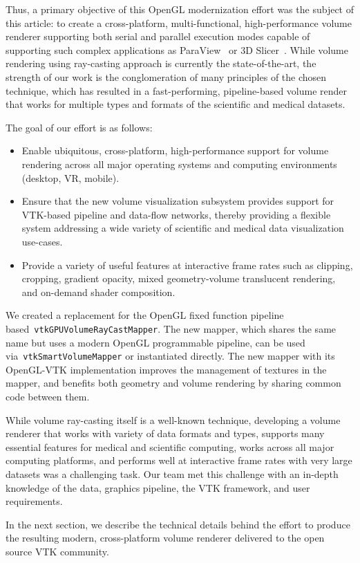 Thus, a primary objective of this OpenGL modernization effort was the
subject of this article: to create a cross-platform, multi-functional,
high-performance volume renderer supporting both serial and parallel execution
modes capable of supporting such complex applications as
ParaView~\citep{ahrens_paraview:_2005,ayachit_paraview_2015} or 3D
Slicer~\citep{fedorov_3d_2012}.  While volume rendering using ray-casting
approach is currently the state-of-the-art, the strength of our work is the
conglomeration of many principles of the chosen technique, which has resulted in a
fast-performing, pipeline-based volume render that works for multiple types and
formats of the scientific and medical datasets. 

The goal of our effort is as follows:

\begin{itemize}
  \item Enable ubiquitous, cross-platform, high-performance support for volume
    rendering across all major operating systems and computing environments
    (desktop, VR, mobile).

  \item Ensure that the new volume visualization subsystem provides support for
    VTK-based pipeline and data-flow networks, thereby providing a flexible
    system addressing a wide variety of scientific and medical data
    visualization use-cases.

  \item Provide a variety of useful features at interactive frame rates such as
    clipping, cropping, gradient opacity, mixed geometry-volume translucent
    rendering, and on-demand shader composition.
\end{itemize}

We created a replacement for the OpenGL fixed function pipeline
based~\texttt{vtkGPUVolumeRayCastMapper}. The new mapper, which shares the same
name but uses a modern OpenGL programmable pipeline, can be used
via~\texttt{vtkSmartVolumeMapper} or instantiated directly. The new mapper with
its OpenGL-VTK implementation improves the management of textures in the mapper,
and benefits both geometry and volume rendering by sharing common code between
them. 

While volume ray-casting itself is
a well-known technique, developing a volume renderer that works with variety of
data formats and types, supports many essential features for medical and
scientific computing, works across all major computing platforms, and performs
well at interactive frame rates with very large datasets was a challenging task. 
Our team met this challenge with an in-depth knowledge of the data, graphics pipeline, the VTK framework, and user requirements.  

In the next section, we describe the
technical details behind the effort to produce the resulting modern,
cross-platform volume renderer delivered to the open source VTK community.
